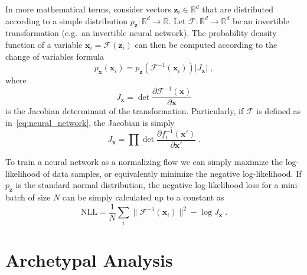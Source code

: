In more mathematical terms, consider vectors $\mathbf{z}_i \in \mathbb{R}^d$
that are distributed according to a simple distribution $p_{\mathbf{z}}:
\mathbb{R}^d \rightarrow \mathbb{R}$. Let $\mathcal{F}: \mathbb{R}^d
\rightarrow \mathbb{R}^d$ be an invertible transformation (e.g.\ an invertible
neural network). The probability density function of a variable $\mathbf{x}_i =
\mathcal{F} (\mathbf{z}_i)$ can then be computed according to the change of
variables formula
\begin{equation}%
    \label{eq:change_of_variables}
    p_{\mathbf{x}}(\mathbf{x}_i) =
    p_{\mathbf{z}}(\mathcal{F}^{-1}(\mathbf{x}_i)) \lvert J_{\mathbf{x}}
    \rvert\;,
\end{equation}
where
\begin{equation}%
    \label{eq:jacobian_det}
    J_{\mathbf{x}} = \det \frac{\partial \mathcal{F}^{-1} (\mathbf{x})}{\partial \mathbf{x}}
\end{equation}
is the Jacobian determinant of the transformation. Particularly, if
$\mathcal{F}$ is defined as in~\autoref{eq:neural_network}, the Jacobian is
simply
\begin{equation}%
    \label{eq:jacobian_chain_rule}
    J_{\mathbf{x}} = \prod \det \frac{\partial f_i^{-1} (\mathbf{x'})}{\partial
    \mathbf{x'}}\;.
\end{equation}

To train a neural network as a normalizing flow we can simply maximize the
log-likelihood of data samples, or equivalently minimize the negative
log-likelihood. If $p_{\mathbf{z}}$ is the standard normal
distribution, the negative log-likelihood loss for a mini-batch of size $N$ can
be simply calculated up to a constant as
\begin{equation}%
    \label{eq:nll_loss}
    \mathrm{NLL} = \frac{1}{N} \sum_i \lVert \mathcal{F}^{-1} (\mathbf{x}_i)
    \rVert^2 - \log J_{\mathbf{x}}\;.
\end{equation}


\section{Archetypal Analysis}%
\label{sec:archetypal_analysis}

